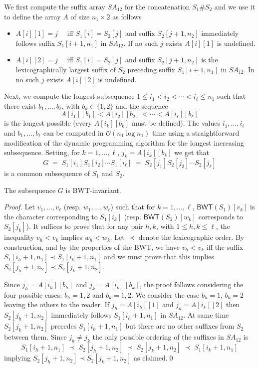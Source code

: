 \documentclass{llncs}
\newcommand{\Oh}[1]
  {\ensuremath{\mathcal{O}\!\left( {#1} \right)}}
\newcommand{\BWT}
  {\ensuremath{\mathsf{BWT}}}
\begin{document}
We first compute the suffix array $SA_{12}$ for the concatenation $S_1\#S_2$
and we use it to define the array $A$ of size $n_1 \times 2$ as follows
\begin{itemize}
\item $A[i][1] = j\quad$ iff $S_1[i] = S_2[j]$ and suffix $S_2[j+1,n_2]$
    immediately follows suffix $S_1[i+1,n_1]$ in $SA_{12}$. If no such
    $j$ exists $A[i][1]$ is undefined.
\item $A[i][2] = j\quad$ iff $S_1[i] = S_2[j]$ and suffix $S_2[j+1,n_2]$
    is the lexicographically largest suffix of $S_2$ preceding suffix
    $S_1[i+1,n_1]$ in $SA_{12}$. In no such $j$ exists $A[i][2]$ is
    undefined.
\end{itemize}
Next, we compute the longest subsequence $1 \leq i_1 < i_2 < \cdots < i_\ell
\leq n_1$ such that there exist $b_1, \ldots, b_\ell$, with $b_k \in \{1,2\}$
and the sequence
$$
A[i_1][b_1] < A[i_2][b_2] < \cdots < A[i_\ell][b_\ell]
$$
is the longest possible (every $A[i_k][b_k]$ must be defined). The values
$i_1, \ldots, i_\ell$ and $b_1, \ldots, b_\ell$ can be computed in
$\Oh{n_1\log n_1}$ time using a straightforward modification of the dynamic
programming algorithm for the longest increasing subsequence. Setting, for
$k=1,\ldots,\ell$, $j_k = A[i_k][b_k]$ we get that
$$
G \;= \; S_1[i_1] S_1[i_2] \cdots S_1[i_\ell] \; = \; S_2[j_1] S_2[j_2] \cdots S_2[j_\ell]
$$
is a common subsequence of $S_1$ and $S_2$.

\begin{lemma}\label{lemma:bwtinv}
The subsequence $G$ is BWT-invariant.
\end{lemma}

\begin{proof}
Let $v_1, \ldots, v_\ell$ (resp. $w_1,\ldots,w_\ell$) such that for
$k=1,\ldots,\ell$, $\BWT(S_1)[v_k]$ is the character corresponding to
$S_1[i_k]$ (resp. $\BWT(S_2)[w_k]$ corresponds to $S_2[j_k]$). It suffices to
prove that for any pair $h,k$, with $1 \leq h,k \leq \ell$,  the inequality
$v_h < v_k$ implies $w_h < w_k$. Let $\prec$ denote the lexicographic order.
By construction, and by the properties of the BWT, we have $v_h < v_k$ iff
the suffix $S_1[i_h+1,n_1] \prec S_1[i_k+1,n_1]$ and we must prove that this
implies $S_2[j_h+1,n_2] \prec S_2[j_k+1,n_2]$.

Since $j_h = A[i_h][b_h]$ and $j_k = A[i_k][b_k]$, the proof follows
considering the four possible cases: $b_h =1,2$ and $b_k=1,2$. We consider
the case $b_h=1$, $b_k=2$ leaving the others to the reader. If $j_h =
A[i_h][1]$ and $j_k = A[i_k][2]$ then $S_2[j_h+1,n_2]$ immediately follows
$S_1[i_h+1,n_1]$ in $SA_{12}$. At same time $S_2[j_k+1,n_2]$ precedes
$S_1[i_h+1,n_1]$ but there are no other suffixes from $S_2$ between them.
Since $j_h \neq j_k$ the only possible ordering of the suffixes in $SA_{12}$
is
$$
S_1[i_h+1,n_1] \;\prec\; S_2[j_h+1,n_2] \;\prec\; S_2[j_k+1,n_2] \;\prec\; S_1[i_k+1,n_1]
$$
implying $S_2[j_h+1,n_2] \prec S_2[j_k+1,n_2]$ as claimed.\qed
\end{proof}
\end{document}
